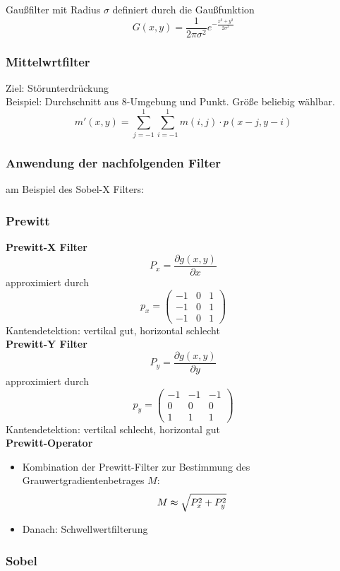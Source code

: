 Gaußfilter mit Radius $\sigma$ definiert durch die Gaußfunktion $$G(x,y) = \frac{1}{2 \pi \sigma^2} e^{-\frac{x^2 + y^2}{2\sigma^2}}$$

\subsubsection*{Mittelwrtfilter}

Ziel: Störunterdrückung \\ Beispiel: Durchschnitt aus 8-Umgebung und Punkt. Größe beliebig wählbar.
$$m'(x,y) = \sum\limits_{j=-1}^1 \sum\limits_{i=-1}^1 m(i,j) \cdot p(x-j,y-i)$$

\subsubsection*{Anwendung der nachfolgenden Filter}
am Beispiel des Sobel-X Filters:

\subsubsection*{Prewitt}

\textbf{Prewitt-X Filter} $$P_x = \frac{\partial g(x,y)}{\partial x}$$ approximiert durch $$p_x = \left( \begin{array}{ccc} -1 & 0 & 1 \\ -1 & 0 & 1 \\ -1 & 0 & 1 \end{array} \right)$$
Kantendetektion: vertikal gut, horizontal schlecht \\
\textbf{Prewitt-Y Filter} $$P_y = \frac{\partial g(x,y)}{\partial y}$$ approximiert durch $$p_y = \left( \begin{array}{rrr} -1 & -1 & -1 \\ 0 & 0 & 0 \\ 1 & 1 & 1 \end{array} \right)$$
Kantendetektion: vertikal schlecht, horizontal gut \\
\textbf{Prewitt-Operator}
\begin{itemize}
\item Kombination der Prewitt-Filter zur Bestimmung des Grauwertgradientenbetrages $M$: $$M \thickapprox \sqrt{P_x^2 + P_y^2}$$
\item Danach: Schwellwertfilterung
\end{itemize}

\subsubsection*{Sobel}

